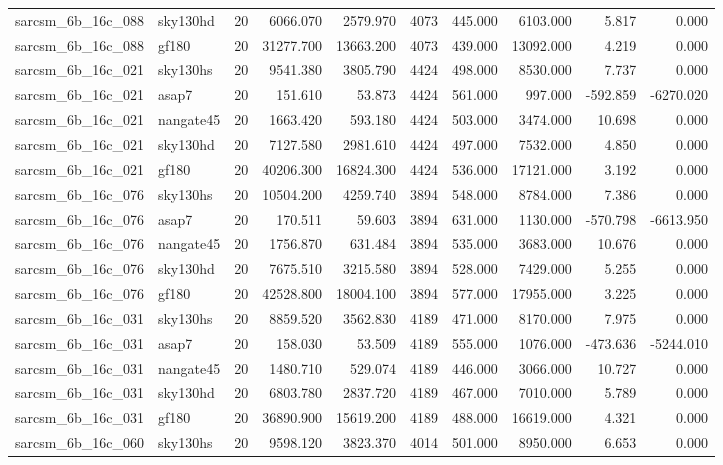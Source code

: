 \documentclass{article}
\begin{document}
\begin{longtable}{llrrrrrrrr}
sarcsm\_6b\_16c\_088 & sky130hd & 20 & 6066.070 & 2579.970 & 4073 & 445.000 & 6103.000 & 5.817 & 0.000 \\
sarcsm\_6b\_16c\_088 & gf180 & 20 & 31277.700 & 13663.200 & 4073 & 439.000 & 13092.000 & 4.219 & 0.000 \\
sarcsm\_6b\_16c\_021 & sky130hs & 20 & 9541.380 & 3805.790 & 4424 & 498.000 & 8530.000 & 7.737 & 0.000 \\
sarcsm\_6b\_16c\_021 & asap7 & 20 & 151.610 & 53.873 & 4424 & 561.000 & 997.000 & -592.859 & -6270.020 \\
sarcsm\_6b\_16c\_021 & nangate45 & 20 & 1663.420 & 593.180 & 4424 & 503.000 & 3474.000 & 10.698 & 0.000 \\
sarcsm\_6b\_16c\_021 & sky130hd & 20 & 7127.580 & 2981.610 & 4424 & 497.000 & 7532.000 & 4.850 & 0.000 \\
sarcsm\_6b\_16c\_021 & gf180 & 20 & 40206.300 & 16824.300 & 4424 & 536.000 & 17121.000 & 3.192 & 0.000 \\
sarcsm\_6b\_16c\_076 & sky130hs & 20 & 10504.200 & 4259.740 & 3894 & 548.000 & 8784.000 & 7.386 & 0.000 \\
sarcsm\_6b\_16c\_076 & asap7 & 20 & 170.511 & 59.603 & 3894 & 631.000 & 1130.000 & -570.798 & -6613.950 \\
sarcsm\_6b\_16c\_076 & nangate45 & 20 & 1756.870 & 631.484 & 3894 & 535.000 & 3683.000 & 10.676 & 0.000 \\
sarcsm\_6b\_16c\_076 & sky130hd & 20 & 7675.510 & 3215.580 & 3894 & 528.000 & 7429.000 & 5.255 & 0.000 \\
sarcsm\_6b\_16c\_076 & gf180 & 20 & 42528.800 & 18004.100 & 3894 & 577.000 & 17955.000 & 3.225 & 0.000 \\
sarcsm\_6b\_16c\_031 & sky130hs & 20 & 8859.520 & 3562.830 & 4189 & 471.000 & 8170.000 & 7.975 & 0.000 \\
sarcsm\_6b\_16c\_031 & asap7 & 20 & 158.030 & 53.509 & 4189 & 555.000 & 1076.000 & -473.636 & -5244.010 \\
sarcsm\_6b\_16c\_031 & nangate45 & 20 & 1480.710 & 529.074 & 4189 & 446.000 & 3066.000 & 10.727 & 0.000 \\
sarcsm\_6b\_16c\_031 & sky130hd & 20 & 6803.780 & 2837.720 & 4189 & 467.000 & 7010.000 & 5.789 & 0.000 \\
sarcsm\_6b\_16c\_031 & gf180 & 20 & 36890.900 & 15619.200 & 4189 & 488.000 & 16619.000 & 4.321 & 0.000 \\
sarcsm\_6b\_16c\_060 & sky130hs & 20 & 9598.120 & 3823.370 & 4014 & 501.000 & 8950.000 & 6.653 & 0.000 \\

\end{longtable}
\end{document}
